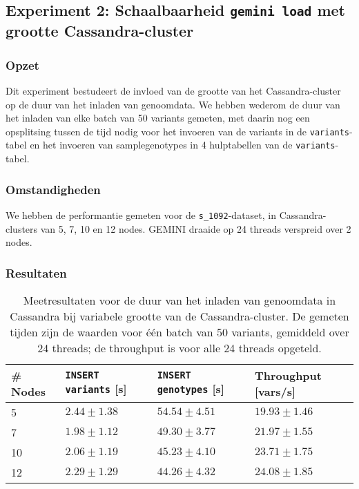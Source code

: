   
\subsection{Experiment 2: Schaalbaarheid \texttt{gemini load} met grootte Cassandra-cluster}
\label{exp2}

\subsubsection{Opzet}

Dit experiment bestudeert de invloed van de grootte van het Cassandra-cluster op de duur van het inladen van genoomdata. We hebben wederom de duur van het inladen van elke batch van 50 variants gemeten, met daarin nog een opsplitsing tussen de tijd nodig voor het invoeren van de variants in de \texttt{variants}-tabel en het invoeren van samplegenotypes in 4 hulptabellen van de \texttt{variants}-tabel.

\subsubsection{Omstandigheden}

We hebben de performantie gemeten voor de \texttt{s\_1092}-dataset, in Cassandra-clusters van 5, 7, 10 en 12 nodes. GEMINI draaide op 24 threads verspreid over 2 nodes.

\newpage
\subsubsection{Resultaten}

\begin{table}[h]
\centering
\begin{tabular}{@{}llll@{}}
\cmidrule(l){1-4}
\multicolumn{1}{|l|}{\textbf{\# Nodes}}  & \multicolumn{1}{l|}{\textbf{\texttt{INSERT variants} [s]}} & \multicolumn{1}{l|}{\textbf{\texttt{INSERT genotypes} [s]}} & \multicolumn{1}{l|}{\textbf{Throughput [vars/s]}}             \\ \midrule
\multicolumn{1}{|l|}{5} & \multicolumn{1}{l|}{$2.44 \pm 1.38$} & \multicolumn{1}{l|}{$54.54 \pm 4.51$}   & \multicolumn{1}{l|}{$19.93 \pm 1.46$}\\
\multicolumn{1}{|l|}{7} & \multicolumn{1}{l|}{$1.98 \pm 1.12$} & \multicolumn{1}{l|}{$49.30 \pm 3.77$}     &  \multicolumn{1}{l|}{$21.97 \pm 1.55$}  \\
\multicolumn{1}{|l|}{10} & \multicolumn{1}{l|}{$2.06 \pm 1.19$} & \multicolumn{1}{l|}{$45.23 \pm 4.10$}     &  \multicolumn{1}{l|}{$23.71 \pm 1.75$}  \\
\multicolumn{1}{|l|}{12} & \multicolumn{1}{l|}{$2.29 \pm 1.29$} &\multicolumn{1}{l|}{$44.26 \pm 4.32$}     &  \multicolumn{1}{l|}{$24.08 \pm 1.85$}  \\
\bottomrule
\end{tabular}
\caption{Meetresultaten voor de duur van het inladen van genoomdata in Cassandra bij variabele grootte van de Cassandra-cluster. De gemeten tijden zijn de waarden voor \'e\'en batch van 50 variants, gemiddeld over 24 threads; de throughput is voor alle 24 threads opgeteld.}
\end{table}

